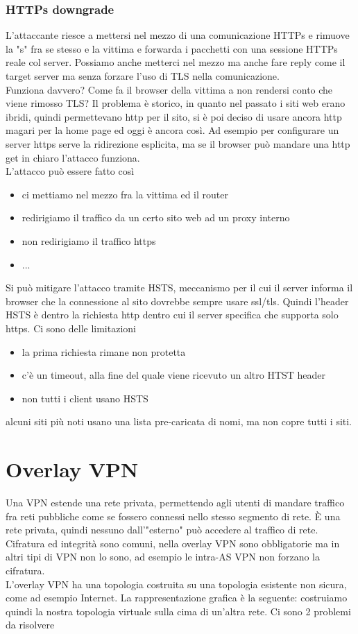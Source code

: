\documentclass[12pt, oneside]{extbook} %
\begin{document}
\subsubsection{HTTPs downgrade}
L'attaccante riesce a mettersi nel mezzo di una comunicazione HTTPs e rimuove la "s" fra se stesso e la vittima e forwarda i pacchetti con una sessione HTTPs reale col server. Possiamo anche metterci nel mezzo ma anche fare reply come il target server ma senza forzare l'uso di TLS nella comunicazione.\\ Funziona davvero? Come fa il browser della vittima a non rendersi conto che viene rimosso TLS? Il problema è storico, in quanto nel passato i siti web erano ibridi, quindi permettevano http per il sito, si è poi deciso di usare ancora http magari per la home page ed oggi è ancora così. Ad esempio per configurare un server https serve la ridirezione esplicita, ma se il browser può mandare una http get in chiaro l'attacco funziona.\\ L'attacco può essere fatto così
\begin{itemize}
\item ci mettiamo nel mezzo fra la vittima ed il router
\item redirigiamo il traffico da un certo sito web ad un proxy interno
\item non redirigiamo il traffico https
\item ...
\end{itemize}
Si può mitigare l'attacco tramite HSTS, meccanismo per il cui il server informa il browser che la connessione al sito dovrebbe sempre usare ssl/tls. Quindi l'header HSTS è dentro la richiesta http dentro cui il server specifica che supporta solo https. Ci sono delle limitazioni
\begin{itemize}
\item la prima richiesta rimane non protetta
\item c'è un timeout, alla fine del quale viene ricevuto un altro HTST header
\item non tutti i client usano HSTS
\end{itemize}
alcuni siti più noti usano una lista pre-caricata di nomi, ma non copre tutti i siti.
\section{Overlay VPN}
Una VPN estende una rete privata, permettendo agli utenti di mandare traffico fra reti pubbliche come se fossero connessi nello stesso segmento di rete. È una rete privata, quindi nessuno dall'"esterno" può accedere al traffico di rete. Cifratura ed integrità sono comuni, nella overlay VPN sono obbligatorie ma in altri tipi di VPN non lo sono, ad esempio le intra-AS VPN non forzano la cifratura.\\L'overlay VPN ha una topologia costruita su una topologia esistente non sicura, come ad esempio Internet. La rappresentazione grafica è la seguente:
costruiamo quindi la nostra topologia virtuale sulla cima di un'altra rete. Ci sono 2 problemi da risolvere
\end{document}
